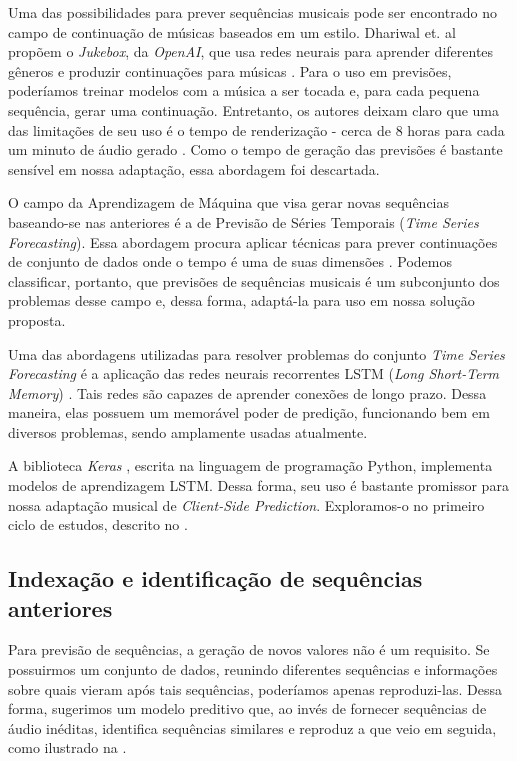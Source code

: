 Uma das possibilidades para prever sequências musicais pode ser encontrado no campo de continuação de músicas baseados em um estilo. Dhariwal et. al propõem o \textit{Jukebox}, da \textit{OpenAI}, que usa redes neurais para aprender diferentes gêneros e produzir continuações para músicas \cite{jukebox}. Para o uso em previsões, poderíamos treinar modelos com a música a ser tocada e, para cada pequena sequência, gerar uma continuação. Entretanto, os autores deixam claro que uma das limitações de seu uso é o tempo de renderização - cerca de 8 horas para cada um minuto de áudio gerado \cite{jukebox}. Como o tempo de geração das previsões é bastante sensível em nossa adaptação, essa abordagem foi descartada.

O campo da Aprendizagem de Máquina que visa gerar novas sequências baseando-se nas anteriores é a de Previsão de Séries Temporais (\textit{Time Series Forecasting}). Essa abordagem procura aplicar técnicas para prever continuações de conjunto de dados onde o tempo é uma de suas dimensões \cite{time_series_forecasting}. Podemos classificar, portanto, que previsões de sequências musicais é um subconjunto dos problemas desse campo e, dessa forma, adaptá-la para uso em nossa solução proposta.

Uma das abordagens utilizadas para resolver problemas do conjunto \textit{Time Series Forecasting} é a aplicação das redes neurais recorrentes LSTM (\textit{Long Short-Term Memory}) \cite{lstm}. Tais redes são capazes de aprender conexões de longo prazo. Dessa maneira, elas possuem um memorável poder de predição, funcionando bem em diversos problemas, sendo amplamente usadas atualmente.

A biblioteca \textit{Keras} \cite{keras}, escrita na linguagem de programação Python, implementa modelos de aprendizagem LSTM. Dessa forma, seu uso é bastante promissor para nossa adaptação musical de \textit{Client-Side Prediction}. Exploramos-o no primeiro ciclo de estudos, descrito no .

\subsection{Indexação e identificação de sequências anteriores}

Para previsão de sequências, a geração de novos valores não é um requisito. Se possuirmos um conjunto de dados, reunindo diferentes sequências e informações sobre quais vieram após tais sequências, poderíamos apenas reproduzi-las. Dessa forma, sugerimos um modelo preditivo que, ao invés de fornecer sequências de áudio inéditas, identifica sequências similares e reproduz a que veio em seguida, como ilustrado na .

